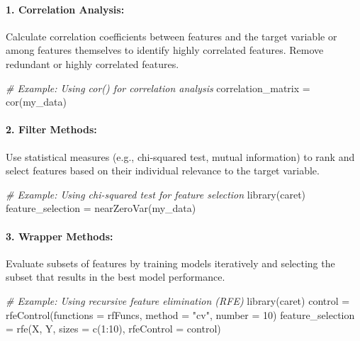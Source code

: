 \documentclass[
]{article}
\newenvironment{Shaded}{}{}
\newcommand{\AttributeTok}[1]{\textcolor[rgb]{0.49,0.56,0.16}{#1}}
\newcommand{\CommentTok}[1]{\textcolor[rgb]{0.38,0.63,0.69}{\textit{#1}}}
\newcommand{\DecValTok}[1]{\textcolor[rgb]{0.25,0.63,0.44}{#1}}
\newcommand{\FunctionTok}[1]{\textcolor[rgb]{0.02,0.16,0.49}{#1}}
\newcommand{\NormalTok}[1]{#1}
\newcommand{\OtherTok}[1]{\textcolor[rgb]{0.00,0.44,0.13}{#1}}
\newcommand{\SpecialCharTok}[1]{\textcolor[rgb]{0.25,0.44,0.63}{#1}}
\newcommand{\StringTok}[1]{\textcolor[rgb]{0.25,0.44,0.63}{#1}}
\begin{document}
\hypertarget{1-correlation-analysis}{%
\paragraph{\texorpdfstring{1. \textbf{Correlation
Analysis:}}{1. Correlation Analysis:}}\label{1-correlation-analysis}}

Calculate correlation coefficients between features and the target
variable or among features themselves to identify highly correlated
features. Remove redundant or highly correlated features.

\begin{Shaded}
\begin{Highlighting}[]
\CommentTok{\# Example: Using cor() for correlation analysis}
\NormalTok{correlation\_matrix }\OtherTok{=} \FunctionTok{cor}\NormalTok{(my\_data)}
\end{Highlighting}
\end{Shaded}

\hypertarget{2-filter-methods}{%
\paragraph{\texorpdfstring{2. \textbf{Filter
Methods:}}{2. Filter Methods:}}\label{2-filter-methods}}

Use statistical measures (e.g., chi-squared test, mutual information) to
rank and select features based on their individual relevance to the
target variable.

\begin{Shaded}
\begin{Highlighting}[]
\CommentTok{\# Example: Using chi{-}squared test for feature selection}
\FunctionTok{library}\NormalTok{(caret)}
\NormalTok{feature\_selection }\OtherTok{=} \FunctionTok{nearZeroVar}\NormalTok{(my\_data)}
\end{Highlighting}
\end{Shaded}

\hypertarget{3-wrapper-methods}{%
\paragraph{\texorpdfstring{3. \textbf{Wrapper
Methods:}}{3. Wrapper Methods:}}\label{3-wrapper-methods}}

Evaluate subsets of features by training models iteratively and
selecting the subset that results in the best model performance.

\begin{Shaded}
\begin{Highlighting}[]
\CommentTok{\# Example: Using recursive feature elimination (RFE)}
\FunctionTok{library}\NormalTok{(caret)}
\NormalTok{control }\OtherTok{=} \FunctionTok{rfeControl}\NormalTok{(}\AttributeTok{functions =}\NormalTok{ rfFuncs, }\AttributeTok{method =} \StringTok{"cv"}\NormalTok{, }\AttributeTok{number =} \DecValTok{10}\NormalTok{)}
\NormalTok{feature\_selection }\OtherTok{=} \FunctionTok{rfe}\NormalTok{(X, Y, }\AttributeTok{sizes =} \FunctionTok{c}\NormalTok{(}\DecValTok{1}\SpecialCharTok{:}\DecValTok{10}\NormalTok{), }\AttributeTok{rfeControl =}\NormalTok{ control)}
\end{Highlighting}
\end{Shaded}
\end{document}
